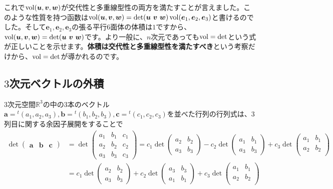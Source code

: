 これで$\operatorname{vol}(\boldsymbol{u}, \boldsymbol{v}, \boldsymbol{w})$が交代性と多重線型性の両方を満たすことが言えました。このような性質を持つ函数は$\vol(\bm{u}, \bm{v}, \bm{w}) = \det(\bm{u}\ \bm{v}\ \bm{w}) \vol(\bm{e}_1, \bm{e}_2, \bm{e}_3)$と書けるのでした。そして$\bm{e}_1, \bm{e}_2, \bm{e}_3$の張る平行$6$面体の体積は$1$ですから、$\vol(\bm{u}, \bm{v}, \bm{w}) = \det(\bm{u}\ \bm{v}\ \bm{w})$です。より一般に、$n$次元であっても$\operatorname{vol} = \det$という式が正しいことを示せます。\textbf{体積は交代性と多重線型性を満たすべき}という考察だけから、$\operatorname{vol} = \det$が導かれるのです。

\subsection{$3$次元ベクトルの外積}

$3$次元空間$\mathbb{R}^3$の中の$3$本のベクトル$\bm{a} = {}^t(a_1, a_2, a_3), \bm{b} = {}^t(b_1, b_2, b_3), \bm{c} = {}^t(c_1, c_2, c_3)$を並べた行列の行列式は、$3$列目に関する余因子展開をすることで
\begin{align*}
\det
\begin{pmatrix}
\bm{a} & \bm{b} & \bm{c} 
\end{pmatrix}
&=
\det
\begin{pmatrix}
a_1 & b_1 & c_1 \\
a_2 & b_2 & c_2 \\
a_3 & b_3 & c_3
\end{pmatrix}
= 
c_1 \det
\begin{pmatrix}
a_2 & b_2 \\
a_3 & b_3
\end{pmatrix}
- c_2 \det
\begin{pmatrix}
a_1 & b_1 \\
a_3 & b_3
\end{pmatrix}
+ c_3 \det
\begin{pmatrix}
a_1 & b_1 \\
a_2 & b_2 \\
\end{pmatrix}
\\
&=
c_1 \det
\begin{pmatrix}
a_2 & b_2 \\
a_3 & b_3
\end{pmatrix}
+ c_2 \det
\begin{pmatrix}
a_3 & b_3 \\
a_1 & b_1
\end{pmatrix}
+ c_3 \det
\begin{pmatrix}
a_1 & b_1 \\
a_2 & b_2 \\
\end{pmatrix}
\end{align*}
